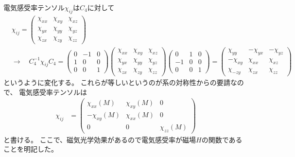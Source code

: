 \documentclass[9pt,dvipdfmx,a4paper]{jsarticle}
\begin{document}
電気感受率テンソル\(\chi_{ij}\)は\(C_4\)に対して
\begin{align}
    &\chi_{ij}
    = \begin{pmatrix}
        \chi_{xx} & \chi_{xy} & \chi_{xz}\\
        \chi_{yx} & \chi_{yy} & \chi_{yz}\\
        \chi_{zx} & \chi_{zy} & \chi_{zz}
    \end{pmatrix}\\
    &\rightarrow\quad
    C_4^{-1}\chi_{ij}C_4
    = \begin{pmatrix}
        0 & -1 & 0\\
        1 & 0 & 0\\
        0 & 0 & 1
    \end{pmatrix}
    \begin{pmatrix}
        \chi_{xx} & \chi_{xy} & \chi_{xz}\\
        \chi_{yx} & \chi_{yy} & \chi_{yz}\\
        \chi_{zx} & \chi_{zy} & \chi_{zz}
    \end{pmatrix}
    \begin{pmatrix}
        0 & 1 & 0\\
        -1 & 0 & 0\\
        0 & 0 & 1
    \end{pmatrix}
    = \begin{pmatrix}
        \chi_{yy} & -\chi_{yx} & -\chi_{yz}\\
        -\chi_{xy} & \chi_{xx} & \chi_{xz}\\
        \chi_{-zy} & \chi_{zx} & \chi_{zz}
    \end{pmatrix}
\end{align}
というように変化する。
これらが等しいというのが系の対称性からの要請なので、
電気感受率テンソルは
\begin{align}
    \chi_{ij}
    &= \begin{pmatrix}
        \chi_{xx}(M) & \chi_{xy}(M) & 0\\
        -\chi_{xy}(M) & \chi_{xx}(M) & 0\\
        0 & 0 & \chi_{zz}(M)
    \end{pmatrix}
\end{align}
と書ける。
ここで、磁気光学効果があるので電気感受率が磁場\(H\)の関数であることを明記した。
\end{document}
